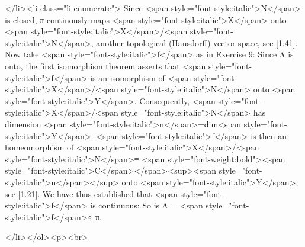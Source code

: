 {{{{</li><li class="li-enumerate">
Since <span style="font-style:italic">N</span> is closed, π continously maps <span style="font-style:italic">X</span> onto <span style="font-style:italic">X</span>/<span style="font-style:italic">N</span>, 
another topological (Hausdorff) vector space, see [1.41]. 
Now take <span style="font-style:italic">f</span> as in Exercise 9: 
Since Λ is onto, the first isomorphism theorem asserts that 
<span style="font-style:italic">f</span> is an isomorphism of <span style="font-style:italic">X</span>/<span style="font-style:italic">N</span> onto <span style="font-style:italic">Y</span>. 
Consequently, <span style="font-style:italic">X</span>/<span style="font-style:italic">N</span> has dimension <span style="font-style:italic">n</span>=dim<span style="font-style:italic">Y</span>. 
<span style="font-style:italic">f</span> is then an homeomorphism of 
<span style="font-style:italic">X</span>/<span style="font-style:italic">N</span>≡ <span style="font-weight:bold"><span style="font-style:italic">C</span></span><sup><span style="font-style:italic">n</span></sup> 
onto <span style="font-style:italic">Y</span>; see [1.21].
We have thus established that <span style="font-style:italic">f</span> is continuous: So is Λ = <span style="font-style:italic">f</span>∘ π.

</li></ol><p><br>

}}}}
